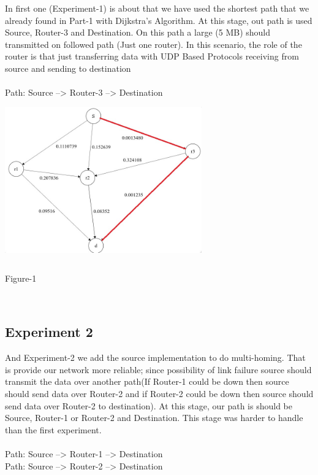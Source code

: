 \documentclass[letterpaper, 12 pt, conference]{ieeeconf}  %
\begin{document}
In first one (Experiment-1) is about that we have used the shortest path that we already found in Part-1 with Dijkstra’s Algorithm. At this stage, out path is used Source, Router-3 and Destination. On this path a large (5 MB) should transmitted on followed path (Just one router). In this scenario, the role of the router is that just transferring data with UDP Based Protocols receiving from source and sending to destination  \\ \\
Path: Source --> Router-3 --> Destination \\

\includegraphics[width=8.5cm, height=7cm]{shortest-path.jpeg}

\begin{center}
Figure-1
\end{center}
\\
\subsection{ Experiment 2 }

And Experiment-2 we add the source implementation to do multi-homing. That is provide our network more reliable; since possibility of link failure source should transmit the data over another path(If Router-1 could be down then source should send data over Router-2 and if Router-2 could be down then source should send data over Router-2 to destination). At this stage, our path is should be Source, Router-1 or Router-2 and Destination. This stage was harder to handle than the first experiment. \\ \\
Path: Source -->   Router-1   --> Destination \\
Path: Source -->   Router-2   --> Destination \\
\end{document}
